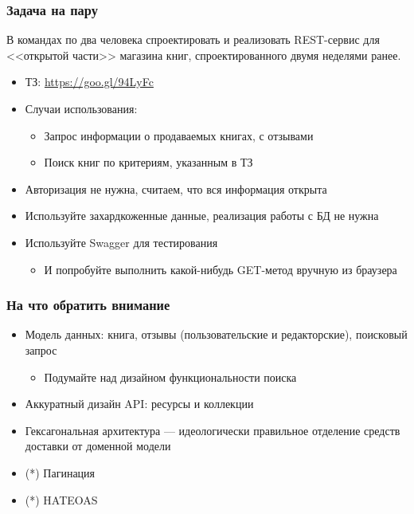 \documentclass{../../slides-style}
\begin{document}
    
    \begin{frame}[plain]
        \titlepage
    \end{frame}

    \begin{frame}
        \frametitle{Задача на пару}
        В командах по два человека спроектировать и реализовать REST-сервис для <<открытой части>> магазина книг, спроектированного двумя неделями ранее.
        \begin{itemize}
            \item ТЗ: \url{https://goo.gl/94LyFc}
            \item Случаи использования:
            \begin{itemize}
                \item Запрос информации о продаваемых книгах, с отзывами
                \item Поиск книг по критериям, указанным в ТЗ
            \end{itemize}
            \item Авторизация не нужна, считаем, что вся информация открыта
            \item Используйте захардкоженные данные, реализация работы с БД не нужна
            \item Используйте Swagger для тестирования
            \begin{itemize}
                \item И попробуйте выполнить какой-нибудь GET-метод вручную из браузера
            \end{itemize}
        \end{itemize}
    \end{frame}

    \begin{frame}
        \frametitle{На что обратить внимание}
        \begin{itemize}
            \item Модель данных: книга, отзывы (пользовательские и редакторские), поисковый запрос
            \begin{itemize}
                \item Подумайте над дизайном функциональности поиска
            \end{itemize}
            \item Аккуратный дизайн API: ресурсы и коллекции
            \item Гексагональная архитектура --- идеологически правильное отделение средств доставки от доменной модели
            \item (*) Пагинация
            \item (*) HATEOAS
        \end{itemize}
    \end{frame}
\end{document}
